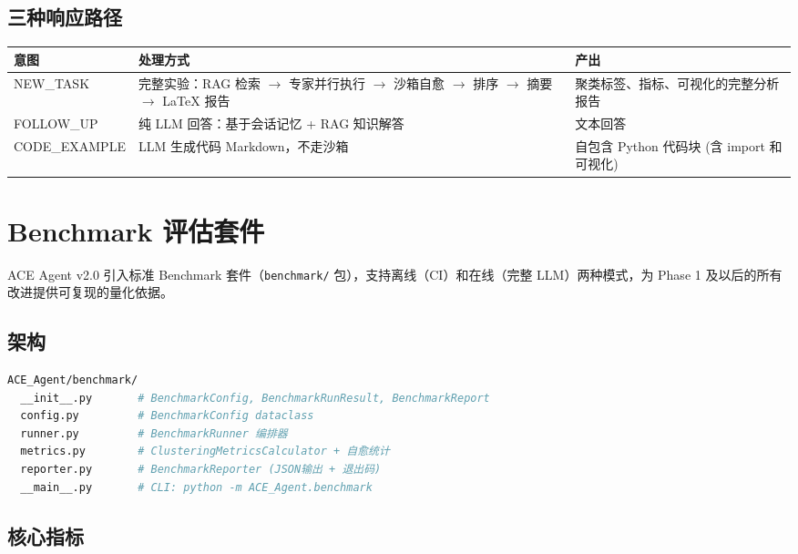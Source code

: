 \documentclass[12pt,a4paper]{article}
\begin{document}
\subsection{三种响应路径}

\begin{table}[H]
\centering
\begin{tabular}{@{}p{2.5cm}p{4.5cm}p{4.5cm}@{}}
\toprule
\textbf{意图} & \textbf{处理方式} & \textbf{产出} \\
\midrule
NEW\_TASK & 完整实验：RAG 检索 $\rightarrow$ 专家并行执行 $\rightarrow$ 沙箱自愈 $\rightarrow$ 排序 $\rightarrow$ 摘要 $\rightarrow$ LaTeX 报告 & 聚类标签、指标、可视化的完整分析报告 \\
FOLLOW\_UP & 纯 LLM 回答：基于会话记忆 + RAG 知识解答 & 文本回答 \\
CODE\_EXAMPLE & LLM 生成代码 Markdown，不走沙箱 & 自包含 Python 代码块 (含 import 和可视化) \\
\bottomrule
\end{tabular}
\end{table}

\newpage

\section{Benchmark 评估套件}

ACE Agent v2.0 引入标准 Benchmark 套件（\texttt{benchmark/} 包），支持离线（CI）和在线（完整 LLM）两种模式，为 Phase 1 及以后的所有改进提供可复现的量化依据。

\subsection{架构}

\begin{lstlisting}[language=bash]
ACE_Agent/benchmark/
  __init__.py       # BenchmarkConfig, BenchmarkRunResult, BenchmarkReport
  config.py         # BenchmarkConfig dataclass
  runner.py         # BenchmarkRunner 编排器
  metrics.py        # ClusteringMetricsCalculator + 自愈统计
  reporter.py       # BenchmarkReporter (JSON输出 + 退出码)
  __main__.py       # CLI: python -m ACE_Agent.benchmark
\end{lstlisting}

\subsection{核心指标}
\end{document}
